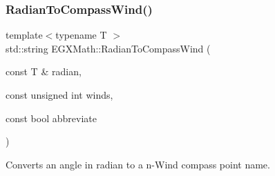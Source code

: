 \subsubsection{\texorpdfstring{Radian\+To\+Compass\+Wind()}{RadianToCompassWind()}}
{\footnotesize\ttfamily template$<$typename T $>$ \\
std\+::string E\+G\+X\+Math\+::\+Radian\+To\+Compass\+Wind (\begin{DoxyParamCaption}\item[{const T \&}]{radian,  }\item[{const unsigned int}]{winds,  }\item[{const bool}]{abbreviate }\end{DoxyParamCaption})}



Converts an angle in radian to a n-\/\+Wind compass point name. 

